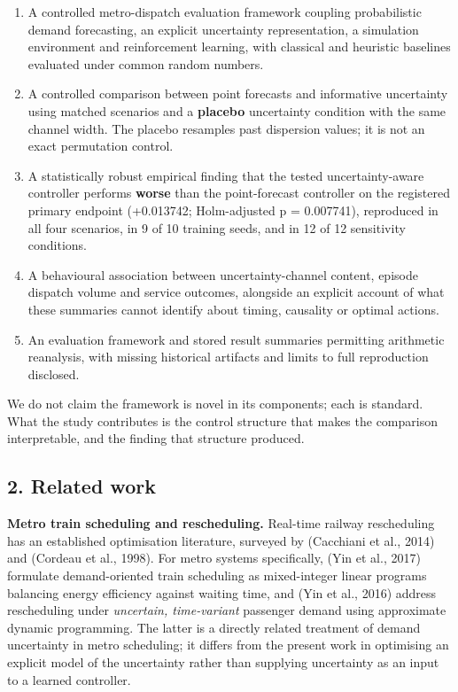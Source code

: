 \documentclass[
]{article}
\providecommand{\tightlist}{%
  \setlength{\itemsep}{0pt}\setlength{\parskip}{0pt}}
\begin{document}
\begin{enumerate}
\def\labelenumi{\arabic{enumi}.}
\tightlist
\item
  A controlled metro-dispatch evaluation framework coupling
  probabilistic demand forecasting, an explicit uncertainty
  representation, a simulation environment and reinforcement learning,
  with classical and heuristic baselines evaluated under common random
  numbers.
\item
  A controlled comparison between point forecasts and informative
  uncertainty using matched scenarios and a \textbf{placebo} uncertainty
  condition with the same channel width. The placebo resamples past
  dispersion values; it is not an exact permutation control.
\item
  A statistically robust empirical finding that the tested
  uncertainty-aware controller performs \textbf{worse} than the
  point-forecast controller on the registered primary endpoint
  (+0.013742; Holm-adjusted p = 0.007741), reproduced in all four
  scenarios, in 9 of 10 training seeds, and in 12 of 12 sensitivity
  conditions.
\item
  A behavioural association between uncertainty-channel content, episode
  dispatch volume and service outcomes, alongside an explicit account of
  what these summaries cannot identify about timing, causality or
  optimal actions.
\item
  An evaluation framework and stored result summaries permitting
  arithmetic reanalysis, with missing historical artifacts and limits to
  full reproduction disclosed.
\end{enumerate}

We do not claim the framework is novel in its components; each is
standard. What the study contributes is the control structure that makes
the comparison interpretable, and the finding that structure produced.

\subsection{2. Related work}\label{2-related-work}

\textbf{Metro train scheduling and rescheduling.} Real-time railway
rescheduling has an established optimisation literature, surveyed by
(Cacchiani et al., 2014) and (Cordeau et al., 1998). For metro systems
specifically, (Yin et al., 2017) formulate demand-oriented train
scheduling as mixed-integer linear programs balancing energy efficiency
against waiting time, and (Yin et al., 2016) address rescheduling under
\emph{uncertain, time-variant} passenger demand using approximate
dynamic programming. The latter is a directly related treatment of
demand uncertainty in metro scheduling; it differs from the present work
in optimising an explicit model of the uncertainty rather than supplying
uncertainty as an input to a learned controller.
\end{document}

